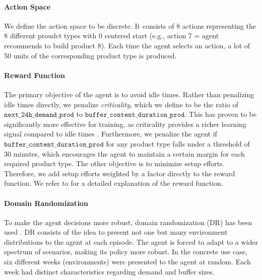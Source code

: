 \paragraph{Action Space}
We define the action space to be discrete. It consists of 8 actions representing the 8 different proudct types with 0 centered start (e.g., action 7 = agent recommends to build product 8). Each time the agent selects an action, a lot of 50 units of the corresponding product type is produced.

\paragraph{Reward Function}
The primary objective of the agent is to avoid idle times. Rather than penalizing idle times directly, we penalize \textit{criticality}, which we define to be the ratio of $\texttt{next\_24h\_demand\_prod}$ to $\texttt{buffer\_content\_duration\_prod}$. This has proven to be significantly more effective for training, as criticality provides a richer learning signal compared to idle times \cite{müller2024reinforcement}. Furthermore, we penalize the agent if $\texttt{buffer\_content\_duration\_prod}$ for any product type falls under a threshold of 30 minutes, which encourages the agent to maintain a certain margin for each required product type.
The other objective is to minimize setup efforts. Therefore, we add setup efforts weighted by a factor directly to the reward function. We refer to \cite{müller2024reinforcement} for a detailed explanation of the reward function.

\paragraph{Domain Randomization}
To make the agent decisions more robust, domain randomization (DR) has been used .
DR consists of the idea to present not one but many environment distributions to the agent at each episode. The agent is forced to adapt to a wider spectrum of scenarios, making its policy more robust.
In the concrete use case, six different weeks (environments) were presented to the agent at random. Each week had distinct characteristics regarding demand and buffer sizes.

